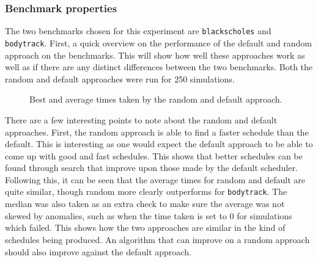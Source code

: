 \documentclass{article}
\begin{document}
\subsubsection{Benchmark properties}
The two benchmarks chosen for this experiment are \texttt{blackscholes} and \texttt{bodytrack}. First, a quick overview on the performance of the default and random approach on the benchmarks. This will show how well these approaches work as well as if there are any distinct differences between the two benchmarks. Both the random and default approaches were run for 250 simulations. 
\begin{figure}[H]
\begin{minipage}{0.5\textwidth}
\end{minipage}
%
\begin{minipage}{0.5\textwidth}
\end{minipage}
\caption{Best and average times taken by the random and default approach.}
\end{figure}
\noindent There are a few interesting points to note about the random and default approaches. First, the random approach is able to find a faster schedule than the default. This is interesting as one would expect the default approach to be able to come up with good and fast schedules. This shows that better schedules can be found through search that improve upon those made by the default scheduler. Following this, it can be seen that the average times for random and default are quite similar, though random more clearly outperforms for \texttt{bodytrack}. The median was also taken as an extra check to make sure the average was not skewed by anomalies, such as when the time taken is set to 0 for simulations which failed. This shows how the two approaches are similar in the kind of schedules being produced. An algorithm that can improve on a random approach should also improve against the default approach. 
\end{document}

